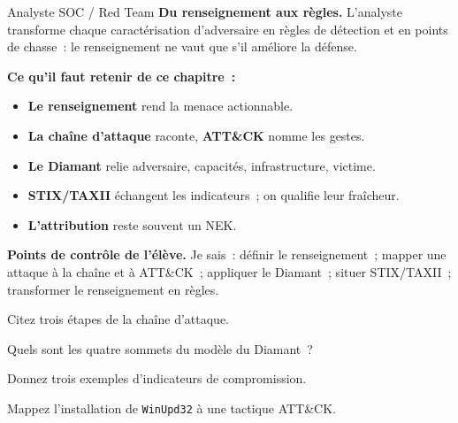 \begin{boxmetier}{Analyste SOC / Red Team}
\textbf{Du renseignement aux règles.} L'analyste transforme chaque
caractérisation d'adversaire en règles de détection et en points de chasse~:
le renseignement ne vaut que s'il améliore la défense.
\end{boxmetier}

\separateur

\begin{boxresume}
\textbf{Ce qu'il faut retenir de ce chapitre~:}
\begin{itemize}
    \item \textbf{Le renseignement} rend la menace actionnable.
    \item \textbf{La chaîne d'attaque} raconte, \textbf{ATT\&CK} nomme les
          gestes.
    \item \textbf{Le Diamant} relie adversaire, capacités, infrastructure,
          victime.
    \item \textbf{STIX/TAXII} échangent les indicateurs~; on qualifie leur
          fraîcheur.
    \item \textbf{L'attribution} reste souvent un NEK.
\end{itemize}
\end{boxresume}

\begin{boxinfo}
\textbf{Points de contrôle de l'élève.} Je sais~: définir le renseignement~;
mapper une attaque à la chaîne et à ATT\&CK~; appliquer le Diamant~; situer
STIX/TAXII~; transformer le renseignement en règles.
\end{boxinfo}

\bigskip

\begin{boxexo}[title={\ding{45}\quad Exercice~17.1. Chaîne \niveaubase}]
Citez trois étapes de la chaîne d'attaque.
\end{boxexo}

\begin{boxexo}[title={\ding{45}\quad Exercice~17.2. Diamant \niveaubase}]
Quels sont les quatre sommets du modèle du Diamant~?
\end{boxexo}

\begin{boxexo}[title={\ding{45}\quad Exercice~17.3. Indicateur \niveaubase}]
Donnez trois exemples d'indicateurs de compromission.
\end{boxexo}

\begin{boxexo}[title={\ding{45}\quad Exercice~17.4. Mapper \niveaumoyen}]
Mappez l'installation de \texttt{WinUpd32} à une tactique ATT\&CK.
\end{boxexo}

